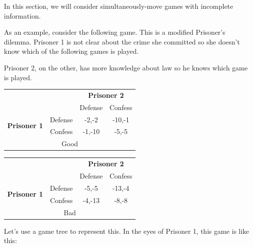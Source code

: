 \documentclass[12pt, oneside]{article}
\begin{document}
In this section, we will consider simultaneously-move games with incomplete information.

As an example, consider the following game. This is a modified Prisoner’s dilemma. Prisoner 1 is not clear about the crime she committed so she doesn’t know which of the following games is played.

Prisoner 2, on the other, has more knowledge about law so he knows which game is played.

\begin{table}[h]
    \centering
    \renewcommand{\arraystretch}{1.2}
    \setlength{\tabcolsep}{8pt}
    \begin{tabular}{c c|c c|}
        \multicolumn{2}{c}{} & \multicolumn{2}{c}{\textbf{Prisoner 2}} \\
        \multicolumn{2}{c}{} & Defense & Confess \\
        \cline{2-4}
        \multirow{2}{*}{\textbf{Prisoner 1}} & Defense & -2,-2 & -10,-1 \\
        & Confess & -1,-10 & -5,-5 \\
        \cline{2-4}
        \multicolumn{4}{c}{Good}
    \end{tabular}
    \hspace{1cm}
    \begin{tabular}{c c|c c|}
        \multicolumn{2}{c}{} & \multicolumn{2}{c}{\textbf{Prisoner 2}} \\
        \multicolumn{2}{c}{} & Defense & Confess \\
        \cline{2-4}
        \multirow{2}{*}{\textbf{Prisoner 1}} & Defense & -5,-5 & -13,-4 \\
        & Confess & -4,-13 & -8,-8 \\
        \cline{2-4}
        \multicolumn{4}{c}{Bad}
    \end{tabular}
\end{table}
\break
Let's use a game tree to represent this. In the eyes of Prisoner 1, this game is like this:

\begin{center}
\end{center}
\end{document}
